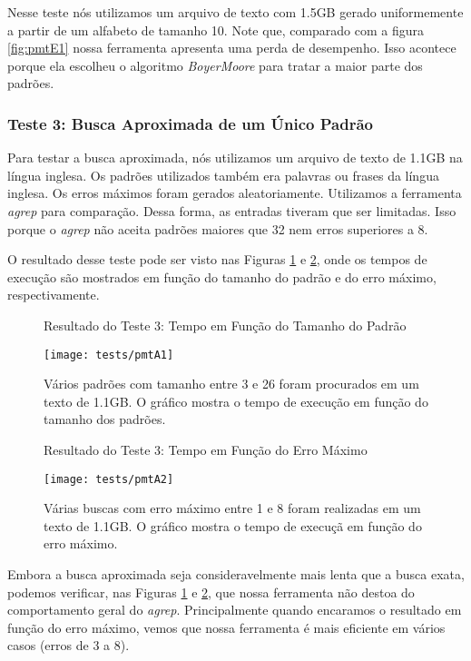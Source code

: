 \documentclass[]{article}
\newcommand{\figref}[1]{figura \ref{#1}}
\begin{document}
Nesse teste nós utilizamos um arquivo de texto com 1.5GB gerado uniformemente a partir de um alfabeto de tamanho 10. Note que, comparado com a \figref{fig:pmtE1} nossa ferramenta apresenta uma perda de desempenho. Isso acontece porque ela escolheu o algoritmo \textit{BoyerMoore} para tratar a maior parte dos padrões.

\subsubsection{Teste 3: Busca Aproximada de um Único Padrão}

Para testar a busca aproximada, nós utilizamos um arquivo de texto de 1.1GB na língua inglesa. Os padrões utilizados também era palavras ou frases da língua inglesa. Os erros máximos foram gerados aleatoriamente. Utilizamos a ferramenta \textit{agrep} para comparação. Dessa forma, as entradas tiveram que ser limitadas. Isso porque o \textit{agrep} não aceita padrões maiores que 32 nem erros superiores a 8.

O resultado desse teste pode ser visto nas Figuras \ref{fig:pmtA1} e \ref{fig:pmtA2}, onde os tempos de execução são mostrados em função do tamanho do padrão e do erro máximo, respectivamente.

\begin{figure}[h]
	{\centering Resultado do Teste 3: Tempo em Função do Tamanho do Padrão\par}
	\texttt{[image: tests/pmtA1]}
\caption{Vários padrões com tamanho entre 3 e 26 foram procurados em um texto de 1.1GB. O gráfico mostra o tempo de execução em função do tamanho dos padrões.}
\label{fig:pmtA1}
\end{figure}

\begin{figure}[h]
	{\centering Resultado do Teste 3: Tempo em Função do Erro Máximo\par}
	\texttt{[image: tests/pmtA2]}
\caption{Várias buscas com erro máximo entre 1 e 8 foram realizadas em um texto de 1.1GB. O gráfico mostra o tempo de execuçã em função do erro máximo.}
\label{fig:pmtA2}
\end{figure}

Embora a busca aproximada seja consideravelmente mais lenta que a busca exata, podemos verificar, nas Figuras \ref{fig:pmtA1} e \ref{fig:pmtA2}, que nossa ferramenta não destoa do comportamento geral do \textit{agrep}. Principalmente quando encaramos o resultado em função do erro máximo, vemos que nossa ferramenta é mais eficiente em vários casos (erros de 3 a 8).
\end{document}
